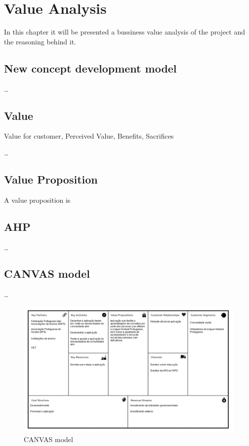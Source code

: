 
\chapter{Value Analysis} %
\label{chap:Chapter2} %

In this chapter it will be presented a bussiness value analysis of the project and the reasoning behind it. 

\section{New concept development model}

\dots

\section{Value}

Value for customer, Perceived Value, Benefits, Sacrifices

\dots

\section{Value Proposition}

A value proposition is 

\section{AHP}

\dots

\section{CANVAS model}

\dots

\begin{figure}[H]
\centering
\includegraphics[width=\textwidth,keepaspectratio]{ch3/assets/CANVAS.png}
\caption[CANVAS]{CANVAS model}
\label{fig:CANVAS model}
\end{figure}

